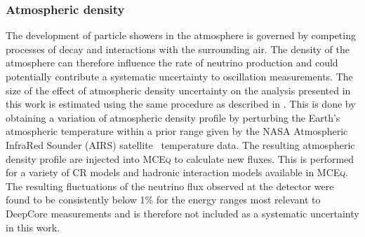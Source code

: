 
\subsubsection{Atmospheric density}

The development of particle showers in the atmosphere is governed by competing processes of decay and interactions with the surrounding air.
The density of the atmosphere can therefore influence the rate of neutrino production and could potentially contribute a systematic uncertainty to oscillation measurements.
The size of the effect of atmospheric density uncertainty on the analysis presented in this work is estimated using the same procedure as described in \cite{MEOWS}.
This is done by obtaining a variation of atmospheric density profile by perturbing the Earth’s atmospheric temperature within a prior range given by the NASA Atmospheric InfraRed Sounder (AIRS) satellite~\cite{AIRS} temperature data.
The resulting atmospheric density profile are injected into \textsc{MCEq} to calculate new fluxes.
This is performed for a variety of CR models and hadronic interaction models available in \textsc{MCEq}.
The resulting fluctuations of the neutrino flux observed at the detector were found to be consistently below 1\% for the energy ranges most relevant to DeepCore measurements and is therefore not included as a systematic uncertainty in this work.

